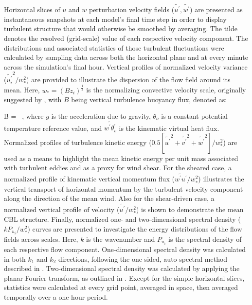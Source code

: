Horizontal slices of $u$ and $w$ perturbation velocity fields ($\widetilde{u^{\prime}}, \widetilde{w^{\prime}}$) are presented as instantaneous snapshots at each model's final time step in order to display turbulent structure that would otherwise be smoothed by averaging. The tilde denotes the resolved (grid-scale) value of each respective velocity component. The distributions and associated statistics of those turbulent fluctuations were calculated by sampling data across both the horizontal plane and at every minute across the simulation's final hour. Vertical profiles of normalized velocity variance ($ \widetilde{u_i^{\prime}}^2  / w_*^2$) are provided to illustrate the dispersion of the flow field around its mean. Here, $w_*= (Bz_i)^{\frac{1}{3}}$ is the normalizing convective velocity scale, originally suggested by  \citet{Deardorff1970}, with $B$ being vertical turbulence buoyancy flux, denoted as:

\be
B =   \mbox{ ,}
\ee
\noindent
where $g$ is the acceleration due to gravity, $\theta_o$ is a constant potential temperature reference value, and $\widetilde{w^{\prime}\theta_v^{\prime}}$ is the kinematic virtual heat flux. Normalized profiles of turbulence kinetic energy ($0.5[\widetilde{u^{\prime}}^2 + \widetilde{v^{\prime}}^2 + \widetilde{w^{\prime}}^2] / w_*^2$) are used as a means to highlight the mean kinetic energy per unit mass associated with turbulent eddies and as a proxy for wind shear. For the sheared case, a normalized profile of kinematic vertical momentum flux ($ \widetilde{w^{\prime}u^{\prime}} / w_*^2$) illustrates the vertical transport of horizontal momentum by the turbulent velocity component along the direction of the mean wind. Also for the shear-driven case, a normalized vertical profile of velocity ($\widetilde{u^{\prime}} / w_*^2$) is shown to demonstrate the mean CBL structure. Finally, normalized one- and two-dimensional spectral density ($kP_{u_i} / w_*^2$) curves are presented to investigate the energy distributions of the flow fields across scales. Here, $k$ is the wavenumber and $P_{u_i}$ is the spectral density of each respective flow component. One-dimensional spectral density was calculated in both $k_1$ and $k_2$ directions, following the one-sided, auto-spectral method described in  \citet{KaiserFeddy}. Two-dimensional spectral density was calculated by applying the planar Fourier transform, as outlined in  \citet{KellyWyngaard2006}. Except for the simple horizontal slices, statistics were calculated at every grid point, averaged in space, then averaged temporally over a one hour period.

